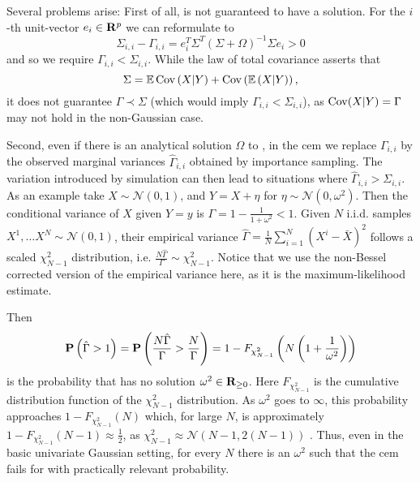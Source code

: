 Several problems arise: First of all,  is not guaranteed to have a solution. For the $i$-th unit-vector $e_{i}\in\R^{p}$ we can reformulate  to 
$$
\Sigma_{i,i} - \Gamma_{i,i} = e_{i}^T\Sigma^{T} \left( \Sigma + \Omega \right)^{-1}\Sigma e_{i} > 0
$$
and so we require $\Gamma_{i,i} < \Sigma_{i,i}$. While the law of total covariance asserts that
$$
\Sigma = \E \cov \left( X | Y \right) + \cov \left( \E \left( X | Y \right) \right),
$$
it does not guarantee $\Gamma \prec \Sigma$ (which would imply $\Gamma_{i,i} < \Sigma_{i,i}$), as $\cov(X|Y) = \Gamma$ may not hold in the non-Gaussian case.

Second, even if there is an analytical solution $\Omega$ to , in the \gls{cem} we replace $\Gamma_{i,i}$ by the observed marginal variances $\hat\Gamma_{i,i}$ obtained by importance sampling. The variation introduced by simulation can then lead to situations where $\hat\Gamma_{i,i} > \Sigma_{i,i}$. As an example take $X \sim \mathcal N(0, 1)$, and $Y = X + \eta$ for $\eta \sim \mathcal N(0, \omega^{2})$. Then the conditional variance of $X$ given $Y = y$ is $\Gamma = 1 - \frac{1}{1 + \omega^{2}} < 1$. Given $N$ i.i.d. samples $X^{1}, \dots X^{N} \sim \mathcal N(0,1)$, their empirical variance $\hat \Gamma = \frac{1}{N} \sum_{i = 1}^{N} (X^{i} - \bar X)^{2} $ follows a scaled $\chi_{N - 1}^{2}$ distribution, i.e. $ \frac{N\hat\Gamma}{\Gamma} \sim \chi^{2}_{N - 1}$. Notice that we use the non-Bessel corrected version of the empirical variance here, as it is the maximum-likelihood estimate. 

Then $$\P \left( \hat \Gamma > 1 \right) = \P \left( \frac{N \hat \Gamma}{\Gamma} > \frac{N}{\Gamma} \right) = 1 - F_{\chi^{2}_{N-1}} \left( N \left( 1 + \frac{1}{\omega^{2}} \right) \right)$$ is the probability that  has no solution $\omega^{2} \in \R_{\geq 0}$. Here $F_{\chi^{2}_{N - 1}}$ is the cumulative distribution function of the $\chi^{2}_{N - 1}$ distribution. As $\omega^{2}$ goes to $\infty$, this probability approaches $1 - F_{\chi^{2}_{N - 1}}(N)$ which, for large $N$, is approximately $1 - F_{\chi^{2}_{N - 1}} (N - 1) \approx \frac{1}{2}$, as $\chi^{2}_{N-1} \approx \mathcal N\left(N - 1, 2 (N-1)\right)$ \citep[Section 18.5]{Johnson1994Continuous}.
Thus, even in the basic univariate Gaussian setting, for every $N$ there is an $\omega^{2}$ such that the \gls{cem} fails for  with practically relevant probability. 

